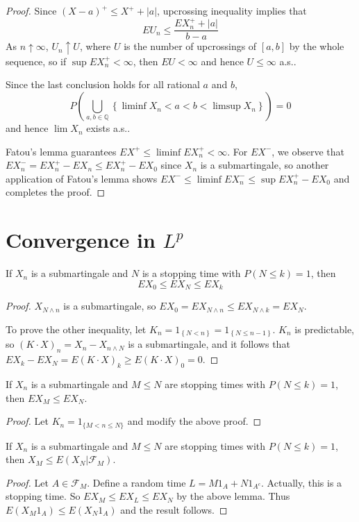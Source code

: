 \begin{proof}
Since $(X-a)^+\le X^++\left|a\right|$, upcrossing inequality implies that \[EU_n\le \frac{ EX^+_n+\left|a\right|}{b-a}\]
As $n\uparrow\infty$, $U_n\uparrow U$, where $U$ is the number of upcrossings of $[a,b]$ by the whole sequence, so if $\sup EX_n^+<\infty$, then $EU<\infty$ and hence $U\le\infty$ a.s..\par
Since the last conclusion holds for all rational $a$ and $b$,\[P(\bigcup_{a,b\in\mathbb{Q}}\left\{\liminf X_n<a<b<\limsup X_n\right\})=0\]
and hence $\lim X_n$ exists a.s..\par
Fatou's lemma guarantees $EX^+\le\liminf EX_n^+<\infty$. For $EX^-$, we observe that $EX_n^-=EX_n^+-EX_n\le EX_n^+-EX_0$ since $X_n$ is a submartingale, so another application of Fatou's lemma shows $EX^-\le\liminf EX^-_n\le \sup EX_n^+-EX_0$ and completes the proof.
\end{proof}
\section{\texorpdfstring{Convergence in $L^p$}{Convergence in Lp}}
\begin{lemma}\label{Bounded Optional Stopping}
If $X_n$ is a submartingale and $N$ is a stopping time with $P(N\le k)=1$, then \[EX_0\le EX_N\le EX_k\]
\end{lemma}
\begin{proof}
$X_{N\wedge n}$ is a submartingale, so $EX_0=EX_{N\wedge n}\le EX_{N\wedge k}=EX_N$.\par
To prove the other inequality, let $K_n=1_{\left\{N<n\right\}}=1_{\left\{N\le n-1\right\}}$. $K_n$ is predictable, so $(K\cdot X)_n=X_n-X_{n\wedge N}$ is a submartingale, and it follows that $EX_k-EX_N=E(K\cdot X)_k\ge E(K\cdot X)_0=0$.
\end{proof}
\begin{lemma}
    If $X_n$ is a submartingale and $M\le N$ are stopping times with $P(N\le k)=1$,
    then $EX_M\le EX_N$.
\end{lemma}
\begin{proof}
    Let $K_n=1_{\{M<n\le N\}}$ and modify the above proof.
\end{proof}
\begin{lemma}
    If $X_n$ is a submartingale and $M\le N$ are stopping times with $P(N\le k)=1$,
    then $X_M\le E(X_N|\mathcal{F}_M)$.
\end{lemma}
\begin{proof}
    Let $A\in\mathcal{F}_M$. Define a random time $L=M 1_A +N 1_{A^c}$. Actually, this is a stopping time.
    So $EX_M\le EX_L\le EX_N$ by the above lemma. Thus $E(X_M 1_A)\le E(X_N 1_A)$ and the result follows.
\end{proof}

